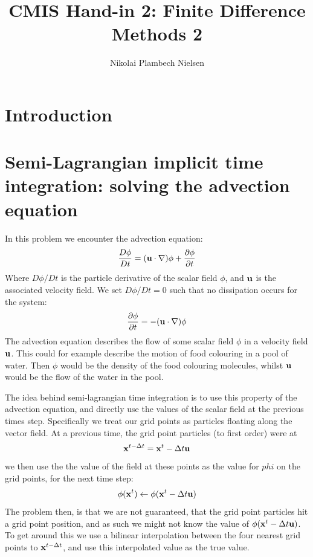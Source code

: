 \documentclass[sigconf]{acmart}
\begin{document}
%
\title{CMIS Hand-in 2: Finite Difference Methods 2}

\author{Nikolai Plambech Nielsen}


\maketitle

\section{Introduction}


\section{Semi-Lagrangian implicit time integration: solving the advection equation}
In this problem we encounter the advection equation:
\begin{equation}\label{key}
	\frac{D \phi}{D t} = (\mathbf{u} \cdot \nabla) \phi + \frac{\partial \phi}{\partial t}
\end{equation}
Where $ D\phi/Dt $ is the particle derivative of the scalar field $ \phi $, and $ \mathbf{u} $ is the associated velocity field. We set $ D\phi/Dt = 0 $ such that no dissipation occurs for the system:
\begin{equation}\label{key}
	 \frac{\partial \phi}{\partial t} = -(\mathbf{u} \cdot \nabla) \phi
\end{equation} 
The advection equation describes the flow of some scalar field $ \phi $ in a velocity field $ \mathbf{u} $. This could for example describe the motion of food colouring in a pool of water. Then $ \phi $ would be the density of the food colouring molecules, whilst $ \mathbf{u} $ would be the flow of the water in the pool.

The idea behind semi-lagrangian time integration is to use this property of the advection equation, and directly use the values of the scalar field at the previous times step. Specifically we treat our grid points as particles floating along the vector field. At a previous time, the grid point particles (to first order) were at
\begin{equation}\label{key}
	\mathbf{x}^{t - \Delta t} = \mathbf{x}^t - \Delta t \mathbf{u}
\end{equation}
we then use the the value of the field at these points as the value for $ phi $ on the grid points, for the next time step:
\begin{equation}\label{key}
	\phi(\mathbf{x}^{t}) \leftarrow \phi(\mathbf{x}^t - \Delta t \mathbf{u}) 
\end{equation}
The problem then, is that we are not guaranteed, that the grid point particles hit a grid point position, and as such we might not know the value of $ \phi(\mathbf{x}^t - \Delta t \mathbf{u}) $. To get around this we use a bilinear interpolation between the four nearest grid points to $ \mathbf{x}^{t - \Delta t} $, and use this interpolated value as the true value.
\end{document}
